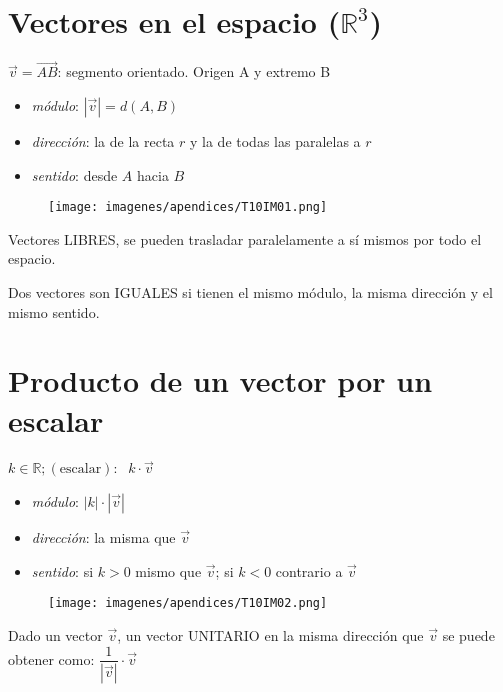 \section{Vectores en el espacio ($\mathbb R^3$)}


$\vec v= \overrightarrow { AB }  $: segmento orientado. Origen A y extremo B
	\begin{multicols}{2}		
	\begin{itemize}
	\item \textit{módulo}: $|\vec v|=d(A,B)$
	\item \textit{dirección}: la de la recta $r$ y la de todas las paralelas a $r$
	\item \textit{sentido}: desde $A$ hacia $B$
	\end{itemize}
	\begin{figure}[H]
		\centering
		\texttt{[image: imagenes/apendices/T10IM01.png]}
	\end{figure}
	\end{multicols}

Vectores LIBRES, se pueden trasladar paralelamente a sí mismos por todo el espacio.
				
Dos vectores son IGUALES si tienen el mismo módulo, la misma dirección y el mismo sentido.

\section{Producto de un vector por un escalar}

$k \in \mathbb{R}; (\text{escalar})$: $\ \ k\cdot \vec v$
\begin{multicols}{2}				
\begin{itemize}
	\item \textit{módulo}: $|k|\cdot |\vec v|$
	\vspace{-2mm}\item \textit{dirección}: la misma que $\vec v$
	\vspace{-2mm}\item \textit{sentido}: si $k>0$ mismo que $\vec v$; si $k<0$ contrario a $\vec v$
\end{itemize} 
\begin{figure}[H]
		\centering
		\texttt{[image: imagenes/apendices/T10IM02.png]}
\end{figure}
\end{multicols}


Dado un vector $\vec v$, un vector UNITARIO en la misma dirección que $\vec v$ se puede obtener como: $\dfrac 1 {|\vec v|}\cdot \vec v$

